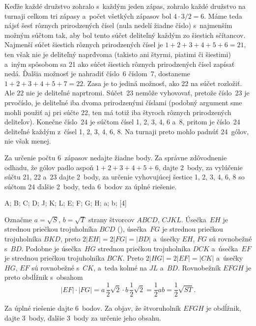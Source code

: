 {%
Keďže každé družstvo zohralo s~každým jeden zápas, zohralo
každé družstvo na turnaji celkom tri zápasy a~počet všetkých zápasov
bol $4\cdot3/2= 6$. Máme teda nájsť šesť rôznych
prirodzených čísel (nula nedelí žiadne číslo) s~najmenším možným
súčtom tak, aby bol tento súčet deliteľný každým zo šiestich
sčítancov. Najmenší súčet šiestich rôznych prirodzených čísel je
$1+2+3+4+5+6=21$, ten však nie je deliteľný napr\. dvoma (takisto ani
štyrmi, piatimi či šiestimi) a~iným spôsobom sa 21 ako súčet šiestich rôznych
prirodzených čísel zapísať nedá. Ďalšia možnosť je nahradiť číslo~6 číslom~7, dostaneme
$1+2+3+4+5+7=22$. Zasa je to jediná možnosť, ako 22 na súčet rozložiť.
Ale $22$ nie je deliteľné napr\. tromi. Súčet~23 nemôže
vyhovovať, pretože číslo~23 je prvočíslo, je deliteľné iba
dvoma prirodzenými číslami (podobný argument sme mohli použiť aj pri súčte 22, ten má totiž
iba štyroch rôznych prirodzených deliteľov). Konečne číslo~24 je súčtom čísel 1, 2,
3, 4, 6 a~8, pritom je číslo~24 deliteľné každým z~čísel 1, 2,
3, 4, 6, 8. Na turnaji preto mohlo padnúť 24~gólov, nie však
menej.

\nobreak\medskip\petit\noindent
 Za určenie počtu 6~zápasov nedajte žiadne body. Za správne zdôvodnenie odhadu, že
 gólov padlo aspoň $1+2+3+4+5+6$, dajte 2~body, za vylúčenie súčtu 21,
 22 a~23 dajte 2~body, za určenie vyhovujúcej šestice 1, 2, 3,
 4, 6, 8 so súčtom 24 ďalšie 2~body, teda 6~bodov za úplné
 riešenie.
\endpetit
\bigbreak}

{%
\fontplace
\tpoint A; \tpoint B; \tlpoint C; \bpoint D;
\tpoint J; \bpoint K; \bpoint L;
\tlpoint E; \lpoint F; \bpoint G; \trpoint H;
\rpoint a; \lpoint b;
[4] \hfil\Obr

Označme $a=\sqrt{S}$, $b=\sqrt{T}$ strany štvorcov $ABCD$, $CJKL$.
Úsečka~$EH$ je strednou priečkou trojuholníka $BCD$ (\obr), úsečka~$FG$ je strednou
\inspicture{}
priečkou trojuholníka $BKD$, preto $2|EH|= 2|FG|=|BD|$ 
a~úsečky $EH$, $FG$ sú rovnobežné s~$BD$. Podobne je úsečka~$HG$
strednou priečkou trojuholníka $DCK$ a~úsečka~$EF$ je strednou
priečkou trojuholníka $BCK$. Preto $2|HG|= 2|EF|=|CK|$ 
a~úsečky $HG$, $EF$ sú rovnobežné s~$CK$, a~teda kolmé na $JL$ 
a~$BD$. Rovnobežník $EFGH$ je preto obdĺžnik s~obsahom
$$
|EF|\cdot|FG|=a\,\frac12\sqrt2\cdot b\,\frac12 \sqrt2 =
\frac12ab = \frac12\sqrt{ST}.
$$


\nobreak\medskip\petit\noindent
Za úplné riešenie dajte 6~bodov.
Za objav, že štvoruholník $EFGH$ je obdĺžnik, dajte 3~body,
ďalšie 3~body za určenie jeho obsahu.
\endpetit
\bigbreak}

